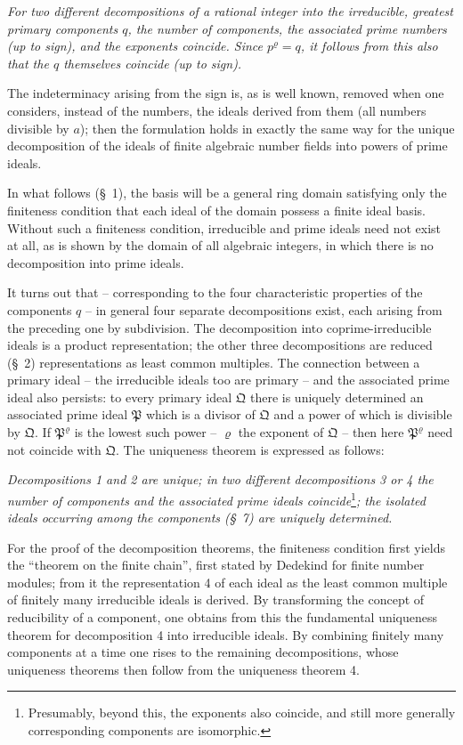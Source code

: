 \documentclass[11pt]{article}
\providecommand{\ideal}[1]{\mathfrak{#1}}
\begin{document}
\emph{For two different decompositions of a rational integer into the irreducible, greatest primary components $q$, the number of components, the associated prime numbers (up to sign), and the exponents coincide. Since $p^\varrho=q$, it follows from this also that the $q$ themselves coincide (up to sign).}

The indeterminacy arising from the sign is, as is well known, removed when one considers, instead of the numbers, the ideals derived from them (all numbers divisible by $a$); then the formulation holds in exactly the same way for the unique decomposition of the ideals of finite algebraic number fields into powers of prime ideals.

In what follows (\S~1), the basis will be a general ring domain satisfying only the finiteness condition that each ideal of the domain possess a finite ideal basis. Without such a finiteness condition, irreducible and prime ideals need not exist at all, as is shown by the domain of all algebraic integers, in which there is no decomposition into prime ideals.

It turns out that -- corresponding to the four characteristic properties of the components $q$ -- in general four separate decompositions exist, each arising from the preceding one by subdivision. The decomposition into coprime-irreducible ideals is a product representation; the other three decompositions are reduced (\S~2) representations as least common multiples. The connection between a primary ideal -- the irreducible ideals too are primary -- and the associated prime ideal also persists: to every primary ideal $\ideal Q$ there is uniquely determined an associated prime ideal $\ideal P$ which is a divisor of $\ideal Q$ and a power of which is divisible by $\ideal Q$. If $\ideal P^\varrho$ is the lowest such power -- $\varrho$ the exponent of $\ideal Q$ -- then here $\ideal P^\varrho$ need not coincide with $\ideal Q$. The uniqueness theorem is expressed as follows:

\emph{Decompositions 1 and 2 are unique; in two different decompositions 3 or 4 the number of components and the associated prime ideals coincide}\footnote{Presumably, beyond this, the exponents also coincide, and still more generally corresponding components are isomorphic.}\emph{; the isolated ideals occurring among the components (\S~7) are uniquely determined.}

For the proof of the decomposition theorems, the finiteness condition first yields the ``theorem on the finite chain'', first stated by Dedekind for finite number modules; from it the representation 4 of each ideal as the least common multiple of finitely many irreducible ideals is derived. By transforming the concept of reducibility of a component, one obtains from this the fundamental uniqueness theorem for decomposition 4 into irreducible ideals. By combining finitely many components at a time one rises to the remaining decompositions, whose uniqueness theorems then follow from the uniqueness theorem 4.
\end{document}
